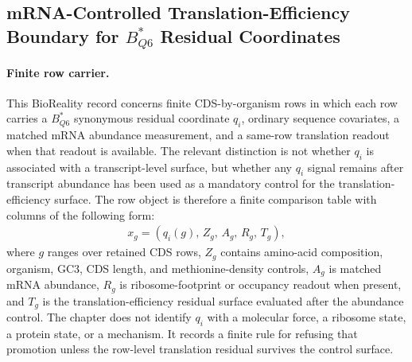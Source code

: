 
\subsection{mRNA-Controlled Translation-Efficiency Boundary for $B^{\ast}_{Q6}$ Residual Coordinates}
\label{subsec:bioreality-q6-mrna-controlled-te-boundary}

\paragraph{Finite row carrier.}
This BioReality record concerns finite CDS-by-organism rows in which each row carries a $B^{\ast}_{Q6}$ synonymous residual coordinate $q_i$, ordinary sequence covariates, a matched mRNA abundance measurement, and a same-row translation readout when that readout is available. The relevant distinction is not whether $q_i$ is associated with a transcript-level surface, but whether any $q_i$ signal remains after transcript abundance has been used as a mandatory control for the translation-efficiency surface. The row object is therefore a finite comparison table with columns of the following form:
$$
\begin{aligned}
  x_g = (q_i(g),\, Z_g,\, A_g,\, R_g,\, T_g),
\end{aligned}
$$
where $g$ ranges over retained CDS rows, $Z_g$ contains amino-acid composition, organism, GC3, CDS length, and methionine-density controls, $A_g$ is matched mRNA abundance, $R_g$ is ribosome-footprint or occupancy readout when present, and $T_g$ is the translation-efficiency residual surface evaluated after the abundance control. The chapter does not identify $q_i$ with a molecular force, a ribosome state, a protein state, or a mechanism. It records a finite rule for refusing that promotion unless the row-level translation residual survives the control surface.

